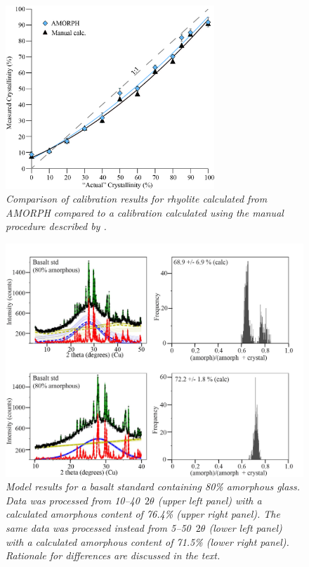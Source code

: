 \documentclass[preprint, a4paper]{elsarticle}
\begin{document}
\begin{figure}[!ht]
\centering
\includegraphics[width=0.7\textwidth]{figures/Comparison.jpg}
\caption{\it Comparison of calibration results for rhyolite calculated from AMORPH compared to a calibration calculated using the manual procedure described by \citet{rowe2012}.\label{fig:Comparison}}
\end{figure}

\begin{figure}[!ht]
\centering
\includegraphics[width=1\textwidth]{figures/Outputs.jpg}
\caption{\it Model results for a basalt standard containing 80\% amorphous glass. Data was processed from 10--40\degree~$2\theta$ (upper left panel) with a calculated amorphous content of 76.4\% (upper right panel). The same data was processed instead from 5--50\degree~$2\theta$ (lower left panel) with a calculated amorphous content of 71.5\% (lower right panel). Rationale for differences are discussed in the text.\label{fig:Outputs}}
\end{figure}
\end{document}
